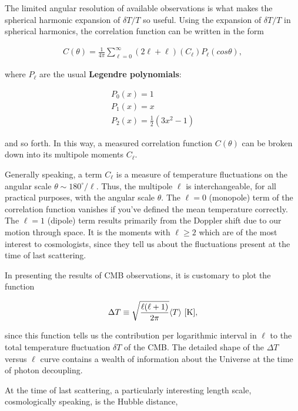 \documentclass[a4paper,11pt]{article}
\begin{document}
{\noindent}The limited angular resolution of available observations is what makes the spherical harmonic expansion of $\delta T/T$ so useful. Using the expansion of $\delta T/T$ in spherical harmonics, the correlation function can be written in the form

\begin{align*}
    C(\theta) = \frac{1}{4\pi} \sum\limits_{\ell=0}^\infty (2\ell+\ell)(C_\ell)P_\ell(cos\theta),
\end{align*}

{\noindent}where $P_\ell$ are the usual \textbf{Legendre polynomials}:

\begin{align*}
    P_0(x) = 1 \\
    P_1(x) = x \\
    P_2(x) = \frac{1}{2}(3x^2-1)
\end{align*}

{\noindent}and so forth. In this way, a measured correlation function $C(\theta)$ can be broken down into its multipole moments $C_\ell$.

{\noindent}Generally speaking, a term $C_\ell$ is a measure of temperature fluctuations on the angular scale $\theta\sim180^\circ/\ell$. Thus, the multipole $\ell$ is interchangeable, for all practical purposes, with the angular scale $\theta$. The $\ell=0$ (monopole) term of the correlation function vanishes if you've defined the mean temperature correctly. The $\ell=1$ (dipole) term results primarily from the Doppler shift due to our motion through space. It is the moments with $\ell\geq2$ which are of the most interest to cosmologists, since they tell us about the fluctuations present at the time of last scattering.

{\noindent}In presenting the results of CMB observations, it is customary to plot the function

\begin{align*}
    \Delta T \equiv \sqrt{\frac{\ell(\ell+1)}{2\pi}}\langle T \rangle ~ [{\rm K}],
\end{align*}

{\noindent}since this function tells us the contribution per logarithmic interval in $\ell$ to the total temperature fluctuation $\delta T$ of the CMB. The detailed shape of the $\Delta T$ versus $\ell$ curve contains a wealth of information about the Universe at the time of photon decoupling. 

{\noindent}At the time of last scattering, a particularly interesting length scale, cosmologically speaking, is the Hubble distance,
\end{document}
